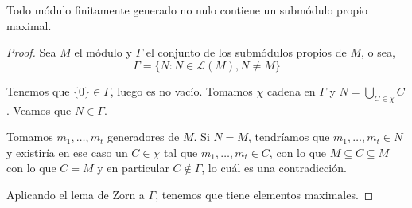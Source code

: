 \begin{lema}
  Todo módulo finitamente generado no nulo contiene un submódulo propio
  maximal.
\end{lema}
\begin{proof}
  Sea \(M\) el módulo y \(\Gamma\) el conjunto de los submódulos propios
  de \(M\), o sea,
  \[
    \Gamma = \{ N:N\in\mathcal{L}(M), N\neq M\}
  \]

  Tenemos que \(\{0\}\in\Gamma\), luego es no vacío. Tomamos \(\chi\)
  cadena en \(\Gamma\) y \(N=\bigcup_{C\in\chi} C\). Veamos que
  \(N\in \Gamma\).

  Tomamos \(m_1,\ldots, m_t\) generadores de \(M\). Si \(N=M\), tendríamos
  que \(m_1,\ldots, m_t\in N\) y existiría en ese caso un \(C\in\chi\)
  tal que \(m_1,\ldots, m_t\in C\), con lo que
  \(M\subseteq C\subseteq M\) con lo que \(C=M\) y en particular
  \(C\notin \Gamma\), lo cuál es una contradicción.

  Aplicando el lema de Zorn a \(\Gamma\), tenemos que tiene elementos
  maximales.

\end{proof}


